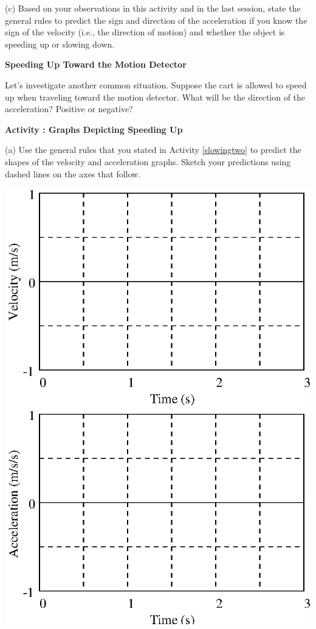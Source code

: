 (c) Based on your observations in this activity and in the last session, state
the general rules to predict the sign and direction of the acceleration if you
know the sign of the velocity (i.e., the direction of motion) and whether the
object is speeding up or slowing down.
\vspace{25mm}

\textbf{Speeding Up Toward the Motion Detector} 

Let's investigate another common situation. Suppose the cart is allowed to speed up when traveling toward the motion detector. What will be the direction of the acceleration? Positive or negative? 

\textbf{Activity : Graphs Depicting Speeding Up} 

(a) Use the general rules that you stated in Activity \ref{slowingtwo} to predict the shapes
of the velocity and acceleration graphs. Sketch your predictions using dashed
lines on the axes that follow.

\vspace{0.3cm}
{\par\centering \includegraphics{slowing/slowing_fig1.eps} \par}
\vspace{0.3cm}

